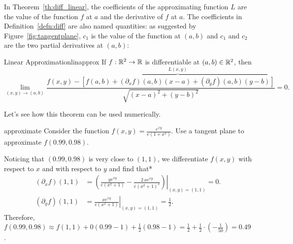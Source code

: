 \documentclass{watsonbook}
\begin{document}
  In Theorem~\ref{th:diff_linear}, the coefficients of the
  approximating function $L$ are the value of the function $f$ at $a$
  and the derivative of $f$ at $a$. The coefficients in
  Definition~\ref{defn:diff} are also named quantities: as suggested
  by Figure~\ref{fig:tangentplane}, $c_1$ is the value of the function
  at $(a,b)$ and $c_1$ and $c_2$ are the two partial derivatives at
  $(a,b)$:

  \vspace{12pt} 

  \begin{theo}{Linear Approximation}{linapprox}
    If $f: \mathbb{R}^2 \to \mathbb{R}$ is differentiable at $(a,b) \in \mathbb{R}^2$, then
    \[
      \lim_{(x,y) \to (a,b)}\frac{f(x,y) - \overbrace{\left[f(a,b) + (\partial_x
        f)(a,b)(x-a) + (\partial_y
        f)(a,b)(y-b)\right]}^{L(x,y)}}{\sqrt{(x-a)^2 + (y-b)^2}} = 0.
    \]
  \end{theo} \bang{-2cm} 

  Let's see how this theorem can be used numerically. 

  \begin{example}{}{approximate}
    Consider the function $f(x,y) = \frac{e^{xy}}{e(1+x^2)}$. Use a
    tangent plane to approximate $f(0.99,0.98)$.
  \end{example}

  \begin{solution}
    Noticing that $(0.99,0.98)$ is very close to $(1,1)$, we
    differentiate $f(x,y)$ with respect to $x$ and with respect to $y$ and
    find that* 
    \begin{align*}
      (\partial_x f)(1,1) &= \left.\left(
                            \frac{y e^{x y}}{e(x^{2} + 1)} -
                            \frac{2 \, x e^{xy}}{{e\left(x^{2} +
                            1\right)}^{2}}\right)\right|_{(x,y)
                            =(1,1)} = 0. \\
      (\partial_y f)(1,1) &=    \left.\frac{x e^{x y}}{e(x^{2} +
                            1)}\right|_{(x,y) = (1,1)} = \frac{1}{2}. 
    \end{align*}
    Therefore, $f(0.99,0.98) \approx f(1,1) + 0(0.99-1) +
    \frac{1}{2}(0.98-1) = \frac{1}{2} + \frac{1}{2} \cdot
    (-\frac{1}{50}) = 0.49$.  
  \end{solution}
\end{document}
